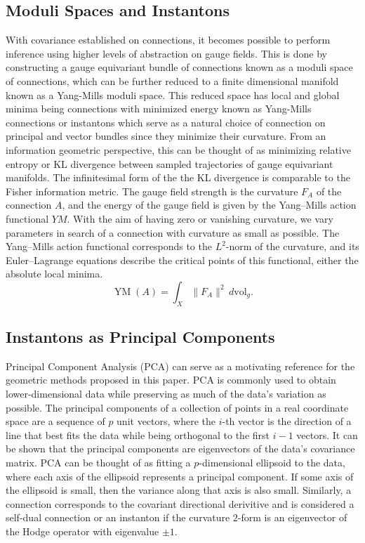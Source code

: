 \documentclass{article}
\begin{document}
\subsection{Moduli Spaces and Instantons}
    With covariance established on connections, it becomes possible to perform inference using higher levels of abstraction on gauge fields. This is done by constructing a gauge equivariant bundle of connections known as a moduli space of connections, which can be further reduced to a finite dimensional manifold known as a Yang-Mills moduli space. This reduced space has local and global minima being connections with minimized energy known as Yang-Mills connections or instantons which serve as a natural choice of connection on principal and vector bundles since they minimize their curvature. From an information geometric perspective, this can be thought of as minimizing relative entropy or KL divergence between sampled trajectories of gauge equivariant manifolds. The infinitesimal form of the the KL divergence is comparable to the Fisher information metric. The gauge field strength is the curvature $F_{A}$ of the connection $A$, and the energy of the gauge field is given by the Yang–Mills action functional $YM$. With the aim of having zero or vanishing curvature, we vary parameters in search of a connection with curvature as small as possible. The Yang–Mills action functional corresponds to the $L^{2}$-norm of the curvature, and its Euler–Lagrange equations describe the critical points of this functional, either the absolute  local minima.   
    \begin{equation}
         {\displaystyle \operatorname {YM} (A)=\int _{X}\|F_{A}\|^{2}\,d\mathrm {vol} _{g}.}
    \end{equation}
    
    \subsection{Instantons as Principal Components}
    Principal Component Analysis (PCA) can serve as a motivating reference for the geometric methods proposed in this paper. PCA is commonly used to obtain lower-dimensional data while preserving as much of the data's variation as possible. The principal components of a collection of points in a real coordinate space are a sequence of $p$ unit vectors, where the $i$-th vector is the direction of a line that best fits the data while being orthogonal to the first $i-1$ vectors.  It can be shown that the principal components are eigenvectors of the data's covariance matrix. PCA can be thought of as fitting a $p$-dimensional ellipsoid to the data, where each axis of the ellipsoid represents a principal component. If some axis of the ellipsoid is small, then the variance along that axis is also small.  Similarly, a connection corresponds to the covariant directional derivitive and is considered a self-dual connection or an instanton if the curvature $2$-form is an eigenvector of the Hodge operator with eigenvalue $\pm 1$.
    
\end{document}
